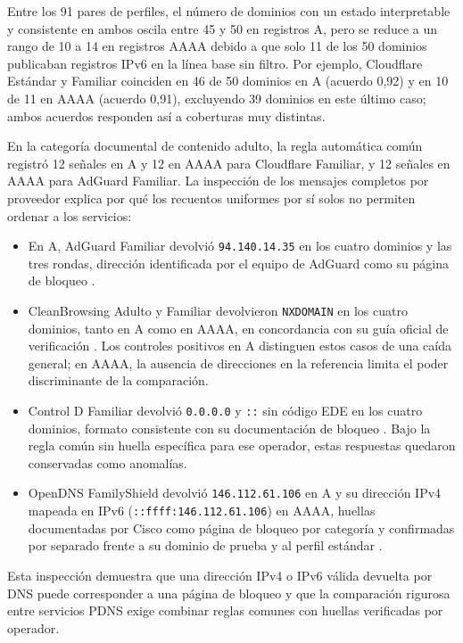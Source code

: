 Entre los 91 pares de perfiles, el número de dominios con un estado interpretable y consistente en ambos oscila entre 45 y 50 en registros A, pero se reduce a un rango de 10 a 14 en registros AAAA debido a que solo 11 de los 50 dominios publicaban registros IPv6 en la línea base sin filtro. Por ejemplo, Cloudflare Estándar y Familiar coinciden en 46 de 50 dominios en A (acuerdo 0,92) y en 10 de 11 en AAAA (acuerdo 0,91), excluyendo 39 dominios en este último caso; ambos acuerdos responden así a coberturas muy distintas.

En la categoría documental de contenido adulto, la regla automática común registró 12 señales en A y 12 en AAAA para Cloudflare Familiar, y 12 señales en AAAA para AdGuard Familiar. La inspección de los mensajes completos por proveedor explica por qué los recuentos uniformes por sí solos no permiten ordenar a los servicios:

\begin{itemize}
\item En A, AdGuard Familiar devolvió \texttt{94.140.14.35} en los cuatro dominios y las tres rondas, dirección identificada por el equipo de AdGuard como su página de bloqueo \cite{adguardblock}.
\item CleanBrowsing Adulto y Familiar devolvieron \texttt{NXDOMAIN} en los cuatro dominios, tanto en A como en AAAA, en concordancia con su guía oficial de verificación \cite{cleanbrowsingverify}. Los controles positivos en A distinguen estos casos de una caída general; en AAAA, la ausencia de direcciones en la referencia limita el poder discriminante de la comparación.
\item Control D Familiar devolvió \texttt{0.0.0.0} y \texttt{::} sin código EDE en los cuatro dominios, formato consistente con su documentación de bloqueo \cite{controldblock}. Bajo la regla común sin huella específica para ese operador, estas respuestas quedaron conservadas como anomalías.
\item OpenDNS FamilyShield devolvió \texttt{146.112.61.106} en A y su dirección IPv4 mapeada en IPv6 (\texttt{::ffff:146.112.61.106}) en AAAA, huellas documentadas por Cisco como página de bloqueo por categoría y confirmadas por separado frente a su dominio de prueba y al perfil estándar \cite{ciscoblock,ciscotest}.
\end{itemize}

Esta inspección demuestra que una dirección IPv4 o IPv6 válida devuelta por DNS puede corresponder a una página de bloqueo y que la comparación rigurosa entre servicios PDNS exige combinar reglas comunes con huellas verificadas por operador.

